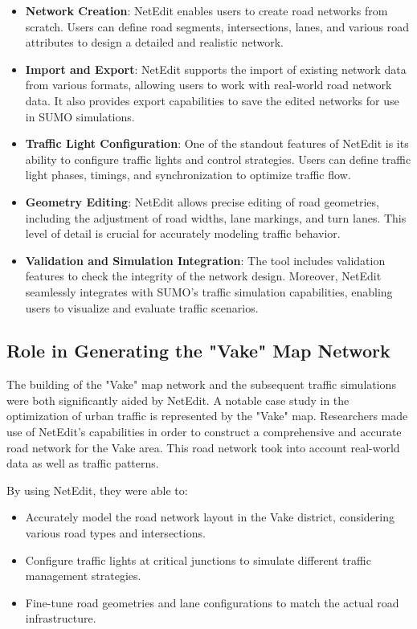 \begin{itemize}
    \item \textbf{Network Creation}: NetEdit enables users to create road networks from scratch. Users can define road segments, intersections, lanes, and various road attributes to design a detailed and realistic network.
    
    \item \textbf{Import and Export}: NetEdit supports the import of existing network data from various formats, allowing users to work with real-world road network data. It also provides export capabilities to save the edited networks for use in SUMO simulations.
    
    \item \textbf{Traffic Light Configuration}: One of the standout features of NetEdit is its ability to configure traffic lights and control strategies. Users can define traffic light phases, timings, and synchronization to optimize traffic flow.
    
    \item \textbf{Geometry Editing}: NetEdit allows precise editing of road geometries, including the adjustment of road widths, lane markings, and turn lanes. This level of detail is crucial for accurately modeling traffic behavior.
    
    \item \textbf{Validation and Simulation Integration}: The tool includes validation features to check the integrity of the network design. Moreover, NetEdit seamlessly integrates with SUMO's traffic simulation capabilities, enabling users to visualize and evaluate traffic scenarios.
\end{itemize}

\subsection{Role in Generating the "Vake" Map Network}

The building of the "Vake" map network and the subsequent traffic simulations were both significantly aided by NetEdit. A notable case study in the optimization of urban traffic is represented by the "Vake" map. Researchers made use of NetEdit's capabilities in order to construct a comprehensive and accurate road network for the Vake area. This road network took into account real-world data as well as traffic patterns.


By using NetEdit, they were able to:

\begin{itemize}
    \item Accurately model the road network layout in the Vake district, considering various road types and intersections.
    \item Configure traffic lights at critical junctions to simulate different traffic management strategies.
    \item Fine-tune road geometries and lane configurations to match the actual road infrastructure.
\end{itemize}

